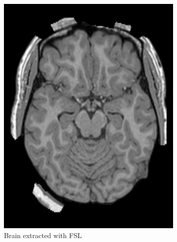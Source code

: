 \documentclass{standalone}
\begin{document}
\begin{figure}[h!]
\begin{subfigure}[b]{0.325\textwidth}
             \includegraphics[scale=0.12]{img/Chap3/FSL54.jpg}
             \caption{Brain extracted with FSL}\label{fig:FSL54}
        \end{subfigure}
        \hfill
        \begin{subfigure}[b]{0.325\textwidth}

\end{subfigure}
\end{figure}
\end{document}

